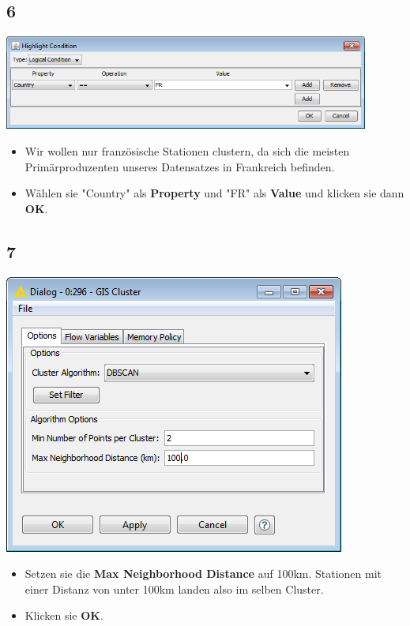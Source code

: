 \documentclass{beamer}
\begin{document}
\subsection{6}
\begin{frame}
	\begin{center}
  		\includegraphics[width=0.9\textwidth]{6.png}
	\end{center}
	\begin{itemize}
		\item Wir wollen nur französische Stationen clustern, da sich die meisten Primärproduzenten unseres Datensatzes in Frankreich befinden.
		\item Wählen sie "Country" als \textbf{Property} und "FR" als \textbf{Value} und klicken sie dann \textbf{OK}.
	\end{itemize}
\end{frame}

\subsection{7}
\begin{frame}
	\begin{center}
  		\includegraphics[height=0.6\textheight]{7.png}
	\end{center}
	\begin{itemize}
		\item Setzen sie die \textbf{Max Neighborhood Distance} auf 100km. Stationen mit einer Distanz von unter 100km landen also im selben Cluster.
		\item Klicken sie \textbf{OK}.
	\end{itemize}
\end{frame}
\end{document}
